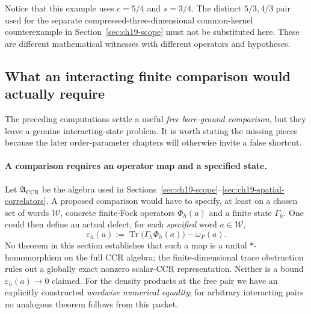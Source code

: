 Notice that this example uses $c=5/4$ and $s=3/4$.  The distinct
$5/3,4/3$ pair used for the separate compressed-three-dimensional
common-kernel counterexample in Section~\ref{sec:ch19-scope} must not be substituted
here.  These are different mathematical witnesses with different
operators and hypotheses.

\subsection{What an interacting finite comparison would actually require}

The preceding computations settle a useful \emph{free bare-ground
comparison}, but they leave a genuine interacting-state problem.  It
is worth stating the missing pieces because the later order-parameter
chapters will otherwise invite a false shortcut.

\paragraph{A comparison requires an operator map and a specified state.}
Let $\mathfrak A_{\mathrm{CCR}}$ be the algebra used in
Sections~\ref{sec:ch19-scope}--\ref{sec:ch19-spatial-correlators}.
A proposed comparison would have to specify, at least on a chosen
set of words $\mathcal W$, concrete finite-Fock operators
$\Phi_h(a)$ and a finite state $\Gamma_h$.  One could then define
an actual defect, for each \emph{specified} word $a\in\mathcal W$,
\begin{equation}
 \varepsilon_h(a)
 :=\operatorname{Tr}\!\bigl(\Gamma_h\Phi_h(a)\bigr)-\omega_P(a).
 \label{eq:ch19-comp-comparison-defect}
\end{equation}
No theorem in this section establishes that such a map is a unital
$*$-homomorphism on the full CCR algebra; the finite-dimensional trace
obstruction rules out a globally exact nonzero scalar-CCR
representation.  Neither is a bound $\varepsilon_h(a)\to0$ claimed.
For the density products at the free pair we have an explicitly
constructed \emph{wordwise numerical equality}; for arbitrary
interacting pairs no analogous theorem follows from this packet.

